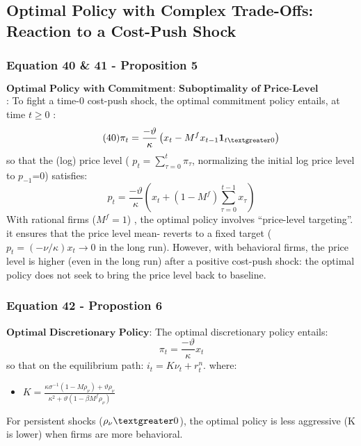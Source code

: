 \documentclass{article}
\begin{document}
\subsection{Optimal Policy with Complex Trade-Offs: Reaction to a Cost-Push Shock}

\subsubsection*{Equation 40 \& 41 - Proposition 5}
$\textbf{Optimal Policy with Commitment: Suboptimality of Price-Level Targeting}$: To fight a time-0 cost-push shock, the optimal commitment policy entails, at time $t \geq 0$ :
\begin{equation}\tag{40}
    \pi_{t}=\frac{-\vartheta}{\kappa}\left(x_{t}-M^{f}x_{t-1}\textbf{1}_{t\textgreater 0}\right)
\end{equation}
so that the (log) price level ( $p_{t}=\sum\limits_{\tau=0}^{t}\pi_{\tau}$, normalizing the initial log price level to $p_{-1}$=0) satisfies:
\begin{equation}\tag{41}
    p_{t}=\frac{-\vartheta}{\kappa}\left(x_{t}+\left(1-M^{f}\right)\sum_{\tau=0}^{t-1}x_{\tau}\right)
\end{equation}
With rational firms ($M^{f}=1$) , the optimal policy involves “price-level targeting”.
it ensures that the price level mean-
reverts to a fixed target ($p_{t}=(-\nu/\kappa)x_{t}\to0$ in the long run). However, with behavioral firms, the price level is higher (even in the long run) after a positive cost-push shock: the optimal policy does not seek to bring the price level back to baseline.

\subsubsection*{Equation 42 - Propostion 6}
$\textbf{Optimal Discretionary Policy}$: The optimal discretionary policy entails:
\begin{equation}\tag{42}
    \pi_{t}=\frac{-\vartheta}{\kappa}x_{t}
\end{equation}
so that on the equilibrium path: $i_{t}=K\nu_{t}+r_{t}^{n}$. where:
\begin{itemize}
    \item $K=\frac{\kappa\sigma^{-1}\left(1-M\rho_{\nu}\right)+\vartheta\rho_{\nu}}{\kappa^{2}+\vartheta\left(1-\beta M^{f}\rho_{\nu}\right)}$
\end{itemize}
For persistent shocks ($\rho_{\nu} \textgreater 0$), the optimal policy is less aggressive (K is
lower) when firms are more behavioral.
\end{document}
